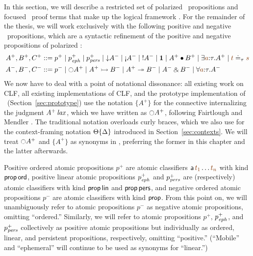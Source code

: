 In this section, we will describe a restricted set of polarized
\ollll~propositions and focused \ollll~proof terms that make up the
logical framework \sls. For the remainder of the thesis, we will work
exclusively with the following positive and negative
\sls~propositions, which are a syntactic refinement of the positive
and negative propositions of polarized \ollll:
\begin{align*}
A^+, B^+, C^+ & ::= p^+ \mid p^+_\meph \mid p^+_\mpers \mid {\downarrow}A^-
  \mid {\gnab}A^- \mid {!}A^- \mid \one \mid A^+ \fuse B^+
  \mid \exists \lf{a}{:}\tau.A^+ \mid \lf{t} \doteq_\tau \lf{s}
\\
A^-, B^-, C^- & ::= p^- \mid {\ocircle}A^+ \mid A^+ \lefti B^- 
  \mid A^+ \righti B^- \mid A^- \with B^-
  \mid \forall \lf{a}{:}\tau.A^-
\end{align*}
We now have to deal with a point of notational dissonance: all
existing work on CLF, all existing implementations of CLF, and the
prototype implementation of \sls~(Section~\ref{sec:prototype}) use the
notation $\{ A^+ \}$ for the connective internalizing the judgment
${A^+}\,{{\it lax}}$, which we have written as ${\ocircle}A^+$, following
Fairtlough and Mendler \cite{fairtlough95propositional}. The
traditional notation overloads curly braces, which we also use for
the context-framing notation 
${\Theta}\{{\Delta}\}$ introduced in Section~\ref{sec:contexts}. We
will treat ${\ocircle}A^+$ and $\{ A^+ \}$ as synonyms in \sls, preferring the
former in this chapter and the latter afterwards.

Positive ordered atomic propositions
$p^+$ are atomic classifiers ${\sf a}\,\lf{t_1}\ldots\lf{t_n}$ with
kind ${\sf prop}\,{\sf ord}$, positive linear atomic propositions
$p^+_{\it eph}$ and $p^+_{\it pers}$ are (respectively) atomic classifiers
with kind ${\sf prop}\,{\sf lin}$ and ${\sf prop}\,{\sf pers}$, and
negative ordered atomic propositions $p^-$ are atomic classifiers
with kind ${\sf prop}$.  From this point on,
we will unambiguously refer to atomic propositions $p^-$ as negative
atomic propositions, omitting ``ordered.'' Similarly, we will refer to
atomic propositions $p^+$, $p^+_{\it eph}$, and $p^+_{\it pers}$ collectively
as positive atomic propositions but individually as ordered, linear,
and persistent propositions, respectively, omitting ``positive.''
(``Mobile'' and ``ephemeral'' will continue to be used as synonyms for
``linear.'')

